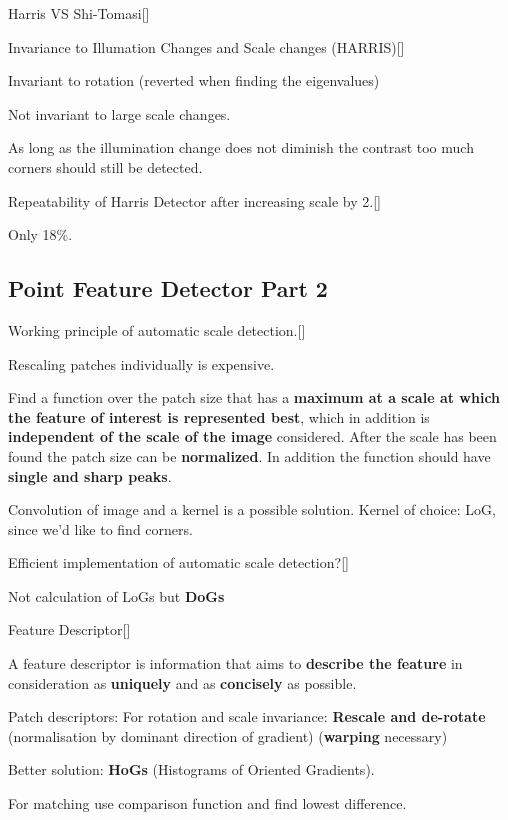 \documentclass[10pt,a4paper]{scrartcl}
\begin{document}
\begin{multicols*}{2}
\begin{QandA}{Harris VS Shi-Tomasi}[\Definition]
\end{QandA}

\begin{QandA}{Invariance to Illumation Changes and Scale changes (HARRIS)}[\Application]
\item Invariant to rotation (reverted when finding the eigenvalues)
\item Not invariant to large scale changes.
\item As long as the illumination change does not diminish the contrast too much corners should still be detected.
\end{QandA}

\begin{QandA}{Repeatability of Harris Detector after increasing scale by 2.}[\Application]
\item Only 18\%.
\end{QandA}

\subsection*{Point Feature Detector Part 2}

\begin{QandA}
{Working principle of automatic scale detection.}[\Derivation]
\item Rescaling patches individually is expensive.
\item Find a function over the patch size that has a \textbf{maximum at a scale at which the feature of interest is represented best}, which in addition is \textbf{independent of the scale of the image} considered. After the scale has been found the patch size can be \textbf{normalized}. In addition the function should have \textbf{single and sharp peaks}.
\item Convolution of image and a kernel is a possible solution. Kernel of choice: LoG, since we'd like to find corners.
\end{QandA}

\begin{QandA}
{Efficient implementation of automatic scale detection?}[\Application]
\item Not calculation of LoGs but \textbf{DoGs}
\end{QandA}

\begin{QandA}
{Feature Descriptor}[\Definition]
\item A feature descriptor is information that aims to \textbf{describe the feature} in consideration as \textbf{uniquely} and as \textbf{concisely} as possible.
\item Patch descriptors: For rotation and scale invariance: \textbf{Rescale and de-rotate} (normalisation by dominant direction of gradient) (\textbf{warping} necessary)
\item Better solution: \textbf{HoGs} (Histograms of Oriented Gradients).
\item For matching use comparison function and find lowest difference.
\end{QandA} 


\end{multicols*}
\end{document}
